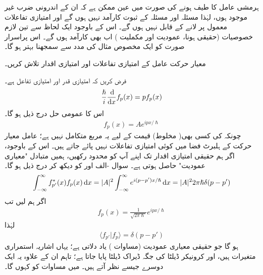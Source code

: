 ہرمشی عامل کا طیف  ہونے کی صورت میں عین ممکن ہے کہ ان کے اندرونی ضرب غیر موجود ہوں، لہٰذا مسئلہ  اور مسئلہ  کے ثبوت کارآمد نہیں ہوں گے اور امتیازی تفاعلات معمول پر لانے کے قابل نہیں ہوں گے۔ اس کے باوجود ایک لحاظ سے تین لازم خصوصیات (حقیقی ہونا، عمودیت اور مکملیت ) اب بھی کارآمد ہوں گے۔ اس پراسرار صورت کو ایک مخصوص مثال کی مدد سے سمجھنا بہتر ہو گا۔



معیار حرکت عامل کے امتیازی تفاعلات اور امتیازی اقدار تلاش کریں۔

\quad
فرض کریں کہ  امتیازی قدر اور  امتیازی تفاعل ہے۔
\begin{align}
\frac{\hslash}{i} \frac{\dif}{\dif x} f_{p}(x) = pf_{p}(x)
\end{align}
اس کا عمومی حل درج ذیل ہو گا۔
\begin{align*}
f_{p}(x) = Ae^{ipx/\hslash}
\end{align*}
چونکہ  کی کسی بھی( مخلوط) قیمت کے لیے یہ  مربع  متکامل  نہیں ہے؛ عامل معیار حرکت کے ہلبرٹ فضا میں کوئی امتیازی تفاعلات نہیں پائے جاتے ہیں۔ اس کے باوجود، اگر ہم حقیقی امتیازی اقدار تک اپنے آپ کو محدود رکھیں، ہمیں متبادل "معیاری عمودیت" حاصل ہوتی ہے۔ سوال -الف اور  کو دیکھ کر درج ذیل ہو گا۔
\begin{align}
\int_{-\infty}^{\infty} f_{p'}^{*}(x)f_{p}(x) \dif x = |A|^{2}\int_{-\infty}^{\infty}e^{i(p-p')x/\hslash} \dif x = |A|^{2}2\pi\hslash\delta(p-p')
\end{align}
اگر ہم  لیں تب 
\begin{align}\label{مساوات_قواعد_امتیازی_تفاعل_معیار_حرکت}
f_{p}(x) = \frac{1}{\sqrt{2\pi\hslash}}e^{ipx/\hslash}
\end{align}
 لہٰذا 
\begin{align}\label{مساوات_قواعد_ڈیراک_معیاری_عمودیت}
\langle f_{p'} | f_{p} \rangle = \delta(p-p')
\end{align}
ہو گا جو حقیقی معیاری عمودیت (مساوات  ) یاد دلاتی ہے؛ یہاں اشاریہ استمراری متغیرات ہیں، اور کرونیکر ڈیلٹا کی جگہ ڈیراک ڈیلٹا پایا جاتا ہے؛ تاہم ان کے علاوہ یہ ایک دوسرے جیسے نظر آتے ہیں۔ میں مساوات  کو  کہوں گا۔ 

